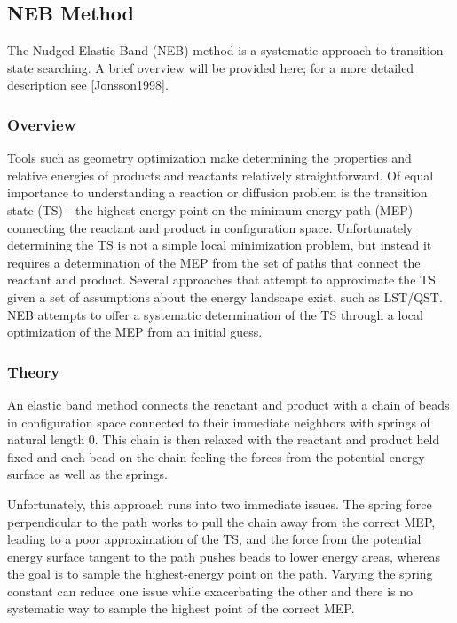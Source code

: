 \documentclass[letterpaper,10pt,english]{sphinxmanual}
\begin{document}
\subsection{NEB Method}
\label{\detokenize{nudged-elastic-band:neb-method}}
The Nudged Elastic Band (NEB) method is a systematic approach to
transition state searching. A brief overview will be provided here; for
a more detailed description see {[}Jonsson1998{]}.


\subsubsection{Overview}
\label{\detokenize{nudged-elastic-band:overview}}
Tools such as geometry optimization make determining the properties and
relative energies of products and reactants relatively straightforward.
Of equal importance to understanding a reaction or diffusion problem is
the transition state (TS) - the highest-energy point on the minimum
energy path (MEP) connecting the reactant and product in configuration
space. Unfortunately determining the TS is not a simple local
minimization problem, but instead it requires a determination of the MEP
from the set of paths that connect the reactant and product. Several
approaches that attempt to approximate the TS given a set of assumptions
about the energy landscape exist, such as LST/QST. NEB attempts to offer
a systematic determination of the TS through a local optimization of the
MEP from an initial guess.


\subsubsection{Theory}
\label{\detokenize{nudged-elastic-band:theory}}
An elastic band method connects the reactant and product with a chain of
beads in configuration space connected to their immediate neighbors with
springs of natural length \(0\). This chain is then relaxed with the
reactant and product held fixed and each bead on the chain feeling the
forces from the potential energy surface as well as the springs.

Unfortunately, this approach runs into two immediate issues. The spring
force perpendicular to the path works to pull the chain away from the
correct MEP, leading to a poor approximation of the TS, and the force
from the potential energy surface tangent to the path pushes beads to
lower energy areas, whereas the goal is to sample the highest-energy
point on the path. Varying the spring constant can reduce one issue
while exacerbating the other and there is no systematic way to sample
the highest point of the correct MEP.
\end{document}
